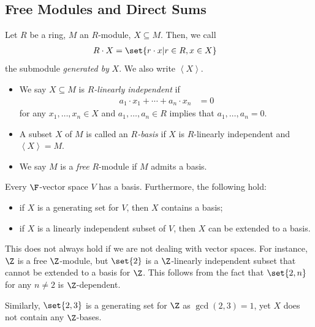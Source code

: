 \documentclass[10pt]{mypackage}
\begin{document}
\subsection{Free Modules and Direct Sums}%
\begin{definition}
  Let $R$ be a ring, $M$ an $R$-module, $X\subseteq M$. Then, we call 
  \begin{align*}
    R\cdot X &= \set{r\cdot x | r\in R, x\in X}
  \end{align*}
  the submodule \textit{generated by} $X$. We also write $ \left\langle X \right\rangle $.
\end{definition}
\begin{definition}\hfill
  \begin{itemize}
    \item We say $X\subseteq M$ is \textit{$R$-linearly independent} if
      \begin{align*}
        a_1\cdot x_1 + \cdots + a_n\cdot x_n &= 0
      \end{align*}
      for any $x_1,\dots,x_n\in X$ and $a_1,\dots,a_n\in R$ implies that $a_1,\dots,a_n = 0$.
    \item A subset $X$ of $M$ is called an \textit{$R$-basis} if $X$ is $R$-linearly independent and $\left\langle X \right\rangle = M$.
    \item We say $M$ is a \textit{free} $R$-module if $M$ admits a basis.
  \end{itemize}
\end{definition}
\begin{theorem}
  Every $\F$-vector space $V$ has a basis. Furthermore, the following hold:
  \begin{itemize}
    \item if $X$ is a generating set for $V$, then $X$ contains a basis;
    \item if $X$ is a linearly independent subset of $V$, then $X$ can be extended to a basis.
  \end{itemize}
\end{theorem}
\begin{example}
  This does not always hold if we are not dealing with vector spaces. For instance, $\Z$ is a free $\Z$-module, but $\set{2}$ is a $\Z$-linearly independent subset that cannot be extended to a basis for $\Z$. This follows from the fact that $\set{2,n}$ for any $n\neq 2$ is $\Z$-dependent.%

  Similarly, $\set{2,3}$ is a generating set for $\Z$ as $\operatorname{gcd}\left( 2,3 \right) = 1$, yet $X$ does not contain any $\Z$-bases.
\end{example}
\end{document}
